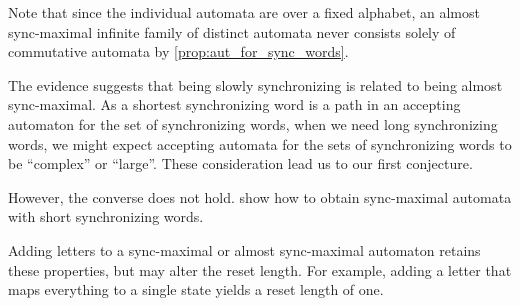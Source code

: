 Note that since the individual automata are over a fixed alphabet,
an almost sync-maximal infinite family of distinct automata
never consists solely of commutative automata by \cref{prop:aut_for_sync_words}.

The evidence suggests %
that being slowly synchronizing is related to 
being almost sync-maximal. 
As a shortest synchronizing
word is a path in an accepting automaton for the set of synchronizing words,
when we need long synchronizing words, %
we might expect accepting automata for the sets of synchronizing words
to be ``complex'' or ``large''. %
These consideration lead us to our first conjecture.

\begin{center}
\end{center}

However, the converse does not hold. 
show how to obtain sync-maximal automata with short synchronizing words.

\begin{example}
	\label{syncmax:discussion:item:alphabet} Adding letters to a sync-maximal or almost sync-maximal automaton retains these properties,
	but may alter the reset length. For example, adding a letter that maps everything to a single 
	state yields a reset length of one. 
\end{example} 

